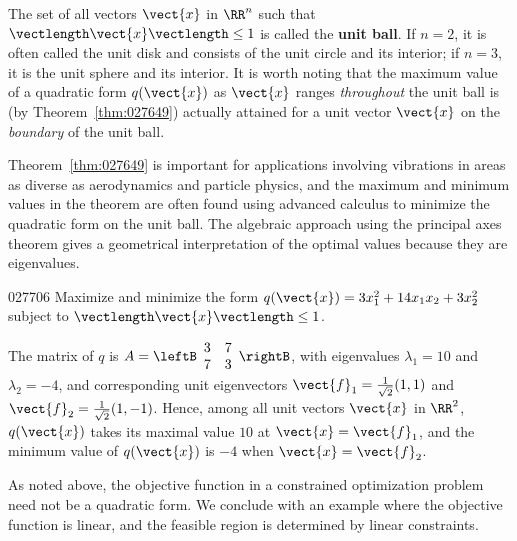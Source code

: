 The set of all vectors $\vect{x}$ in $\RR^n$ such that $\vectlength\vect{x}\vectlength \leq 1$ is called the \textbf{unit ball}. If $n = 2$, it is often called the unit disk and consists of the unit circle and its interior; if $n = 3$, it is the unit sphere and its interior. It is worth noting that the maximum value of a quadratic form $q(\vect{x})$ as $\vect{x}$ ranges \textit{throughout} the unit ball is (by Theorem~\ref{thm:027649}) actually attained for a unit vector $\vect{x}$ on the \textit{boundary} of the unit ball.


Theorem~\ref{thm:027649} is important for applications involving vibrations in areas as diverse as aerodynamics and particle physics, and the maximum and minimum values in the theorem are often found using advanced calculus to minimize the quadratic form on the unit ball. The algebraic approach using the principal axes theorem gives a geometrical interpretation of the optimal values because they are eigenvalues.


\begin{example}{}{027706}
Maximize and minimize the form $q(\vect{x})= 3x_{1}^2 + 14x_{1}x_{2} + 3x_{2}^2$ subject to $\vectlength\vect{x}\vectlength \leq 1$.


\begin{solution}
  The matrix of $q$ is $A = \leftB \begin{array}{rr}
  3 & 7 \\
  7 & 3
  \end{array}\rightB$, with eigenvalues $\lambda_{1} = 10$ and $\lambda_{2} = -4$, and corresponding unit eigenvectors $\vect{f}_{1} = \frac{1}{\sqrt{2}}(1, 1)$ and $\vect{f}_{2} = \frac{1}{\sqrt{2}}(1, -1)$. Hence, among all unit vectors $\vect{x}$ in $\RR^2$, $q(\vect{x})$ takes its maximal value $10$ at $\vect{x} = \vect{f}_{1}$, and the minimum value of $q(\vect{x})$ is $-4$ when $\vect{x} = \vect{f}_{2}$.
\end{solution}
\end{example}

As noted above, the objective function in a constrained optimization problem need not be a quadratic form. We conclude with an example where the objective function is linear, and the feasible region is determined by linear constraints.

\newpage

